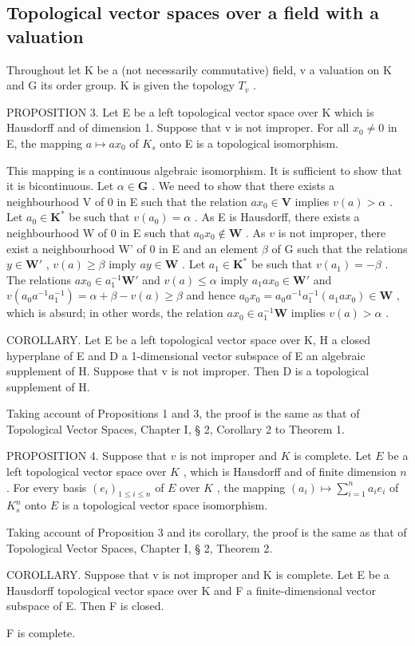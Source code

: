 \subsection{Topological vector spaces over a field with a valuation}

Throughout let K be a (not necessarily commutative) field, v a valuation on K and G its order group. K is given the topology \(T_{v}\) .

PROPOSITION 3. Let E be a left topological vector space over K which is Hausdorff and of dimension 1. Suppose that v is not improper. For all \(x_{0} \neq 0\) in E, the mapping \(a \mapsto ax_{0}\) of \(K_{s}\) onto E is a topological isomorphism.

This mapping is a continuous algebraic isomorphism. It is sufficient to show that it is bicontinuous. Let \(\alpha \in \mathbf{G}\) . We need to show that there exists a neighbourhood V of 0 in E such that the relation \(ax_0 \in \mathbf{V}\) implies \(v(a) > \alpha\) . Let \(a_0 \in \mathbf{K}^*\) be such that \(v(a_0) = \alpha\) . As E is Hausdorff, there exists a neighbourhood W of 0 in E such that \(a_0 x_0 \notin \mathbf{W}\) . As \(v\) is not improper, there exist a neighbourhood W' of 0 in E and an element \(\beta\) of G such that the relations \(y \in \mathbf{W}'\) , \(v(a) \geqslant \beta\) imply \(ay \in \mathbf{W}\) . Let \(a_1 \in \mathbf{K}^*\) be such that \(v(a_1) = -\beta\) . The relations \(ax_0 \in a_1^{-1} \mathbf{W}'\) and \(v(a) \leqslant \alpha\) imply \(a_1 ax_0 \in \mathbf{W}'\) and \(v(a_0 a^{-1} a_1^{-1}) = \alpha + \beta - v(a) \geqslant \beta\) and hence \(a_0 x_0 = a_0 a^{-1} a_1^{-1}(a_1 ax_0) \in \mathbf{W}\) , which is absurd; in other words, the relation \(ax_0 \in a_1^{-1} \mathbf{W}\) implies \(v(a) > \alpha\) .

COROLLARY. Let E be a left topological vector space over K, H a closed hyperplane of E and D a 1-dimensional vector subspace of E an algebraic supplement of H. Suppose that v is not improper. Then D is a topological supplement of H.

Taking account of Propositions 1 and 3, the proof is the same as that of Topological Vector Spaces, Chapter I, § 2, Corollary 2 to Theorem 1.

PROPOSITION 4. Suppose that \(v\) is not improper and \(K\) is complete. Let \(E\) be a left topological vector space over \(K\) , which is Hausdorff and of finite dimension \(n\) . For every basis \((e_i)_{1 \leqslant i \leqslant n}\) of \(E\) over \(K\) , the mapping \((a_i) \mapsto \sum_{i=1}^{n} a_i e_i\) of \(K_s^n\) onto \(E\) is a topological vector space isomorphism.

Taking account of Proposition 3 and its corollary, the proof is the same as that of Topological Vector Spaces, Chapter I, § 2, Theorem 2.

COROLLARY. Suppose that v is not improper and K is complete. Let E be a Hausdorff topological vector space over K and F a finite-dimensional vector subspace of E. Then F is closed.

F is complete.

